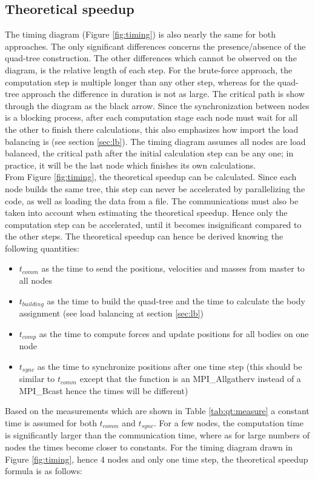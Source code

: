 \subsection{Theoretical speedup}
The timing diagram (Figure \ref{fig:timing}) is also nearly the same for both approaches. The only significant differences concerns the presence/absence of the quad-tree construction. The other differences which cannot be observed on the diagram, is the relative length of each step. For the brute-force approach, the computation step is multiple longer than any other step, whereas for the quad-tree approach the difference in duration is not as large. The critical path is show through the diagram as the black arrow. Since the synchronization between nodes is a blocking process, after each computation stage each node must wait for all the other to finish there calculations, this also emphasizes how import the load balancing is (see section \ref{sec:lb}). The timing diagram assumes all nodes are load balanced, the critical path after the initial calculation step can be any one; in practice, it will be the last node which finishes its own calculations.\\
From Figure \ref{fig:timing}, the theoretical speedup can be calculated. Since each node builds the same tree, this step can never be accelerated by parallelizing the code, as well as loading the data from a file. The communications must also be taken into account when estimating the theoretical speedup. Hence only the computation step can be accelerated, until it becomes insignificant compared to the other steps. The theoretical speedup can hence be derived knowing the following quantities:
\begin{itemize}
\item $t_{comm}$ as the time to send the positions, velocities and masses from master to all nodes
\item  $t_{building}$ as the time to build the quad-tree and the time to calculate the body assignment (see load balancing at section \ref{sec:lb})
\item $t_{comp}$ as the time to compute forces and update positions for all bodies on one node
\item $t_{sync}$ as the time to synchronize positions after one time step (this should be similar to $t_{comm}$ except that the function is an MPI\_Allgatherv instead of a MPI\_Bcast hence the times will be different)
\end{itemize}
Based on the measurements which are shown in Table \ref{tab:qt:measure} a constant time is assumed for both $t_{comm}$ and $t_{sync}$. For a few nodes, the computation time is significantly larger than the communication time, where as for large numbers of nodes the times become closer to constants. For the timing diagram drawn in Figure \ref{fig:timing}, hence 4 nodes and only one time step, the theoretical speedup formula is as follows:

